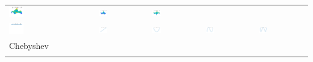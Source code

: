 \documentclass[11pt,compress,xcolor={usenames,dvipsnames},aspectratio=169]{beamer}
\begin{document}
\begin{frame}
\begin{tabular}{>{\centering}m{}>{\centering}m{}>{\centering}m{}>{\centering}m{}>{\centering}m{}}
\includegraphics[width =0.18\textwidth]{FourierSampling/Legendre_Degree_1_3.png}  &
\includegraphics[width =0.18\textwidth]{FourierSampling/Legendre_Degree_2_2.png}  &
\includegraphics[width =0.18\textwidth]{FourierSampling/Legendre_Degree_2_3.png} 
\tabularnewline[0ex]
		\includegraphics[width =0.18\textwidth]{FourierSampling/Chebyshev_Degree_0.png}  &
\includegraphics[width =0.18\textwidth]{FourierSampling/Chebyshev_Degree_1.png}  &
\includegraphics[width =0.18\textwidth]{FourierSampling/Chebyshev_Degree_2.png}  &
\includegraphics[width =0.18\textwidth]{FourierSampling/Chebyshev_Degree_3.png}  &
\includegraphics[width =0.18\textwidth]{FourierSampling/Chebyshev_Degree_4.png} 
\tabularnewline[-7ex]
Chebyshev \tabularnewline
\tabularnewline

\end{tabular}
\end{frame}
\end{document}
